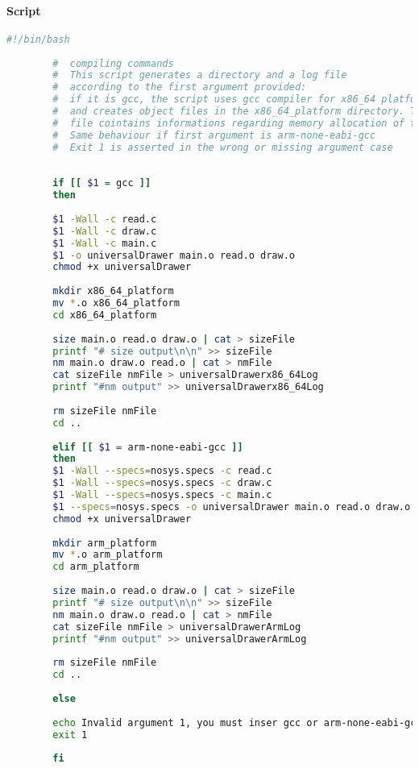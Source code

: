 \documentclass[a4paper]{article}
\begin{document}
		\paragraph{Script}
		\begin{center}
		\begin{lstlisting}[language=bash, basicstyle=\small]
		#!/bin/bash
		
		#  compiling commands
		#  This script generates a directory and a log file
		#  according to the first argument provided:
		#  if it is gcc, the script uses gcc compiler for x86_64 platforms
		#  and creates object files in the x86_64_platform directory. The log
		#  file cointains informations regarding memory allocation of the code
		#  Same behaviour if first argument is arm-none-eabi-gcc
		#  Exit 1 is asserted in the wrong or missing argument case
		
		
		if [[ $1 = gcc ]]
		then
		
		$1 -Wall -c read.c 
		$1 -Wall -c draw.c 
		$1 -Wall -c main.c
		$1 -o universalDrawer main.o read.o draw.o
		chmod +x universalDrawer
		
		mkdir x86_64_platform
		mv *.o x86_64_platform
		cd x86_64_platform
		
		size main.o read.o draw.o | cat > sizeFile 
		printf "# size output\n\n" >> sizeFile
		nm main.o draw.o read.o | cat > nmFile
		cat sizeFile nmFile > universalDrawerx86_64Log
		printf "#nm output" >> universalDrawerx86_64Log
		
		rm sizeFile nmFile
		cd ..
		
		elif [[ $1 = arm-none-eabi-gcc ]]
		then
		$1 -Wall --specs=nosys.specs -c read.c 
		$1 -Wall --specs=nosys.specs -c draw.c 
		$1 -Wall --specs=nosys.specs -c main.c
		$1 --specs=nosys.specs -o universalDrawer main.o read.o draw.o
		chmod +x universalDrawer
		
		mkdir arm_platform
		mv *.o arm_platform
		cd arm_platform
		
		size main.o read.o draw.o | cat > sizeFile 
		printf "# size output\n\n" >> sizeFile
		nm main.o draw.o read.o | cat > nmFile
		cat sizeFile nmFile > universalDrawerArmLog
		printf "#nm output" >> universalDrawerArmLog
		
		rm sizeFile nmFile
		cd ..
		
		else
		
		echo Invalid argument 1, you must inser gcc or arm-none-eabi-gcc
		exit 1
		
		fi
		\end{lstlisting}
		\end{center}
\end{document}
